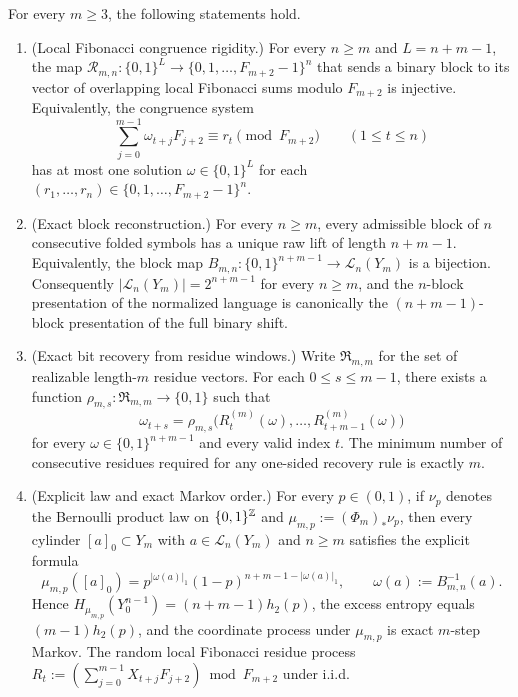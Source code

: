 \begin{theorem}
\label{thm:intro-main}
For every $m\ge 3$, the following statements hold.
\begin{enumerate}[label=\textup{(\roman*)}]
\item\label{item:main-congruence-rigidity}
\textup{(Local Fibonacci congruence rigidity.)}
For every $n\ge m$ and $L=n+m-1$, the map
$\mathcal R_{m,n}:\{0,1\}^L\to\{0,1,\ldots,F_{m+2}-1\}^n$ that sends a binary
block to its vector of overlapping local Fibonacci sums modulo $F_{m+2}$ is
injective.  Equivalently, the congruence system
\[
\sum_{j=0}^{m-1}\omega_{t+j}F_{j+2}\equiv r_t\pmod{F_{m+2}}
\qquad (1\le t\le n)
\]
has at most one solution $\omega\in\{0,1\}^L$ for each
$(r_1,\ldots,r_n)\in\{0,1,\ldots,F_{m+2}-1\}^n$.
\item\label{item:main-block-bijection}
\textup{(Exact block reconstruction.)}
For every $n\ge m$, every admissible block of $n$ consecutive folded
symbols has a unique raw lift of length $n+m-1$.  Equivalently, the block map
$B_{m,n}:\{0,1\}^{n+m-1}\to\mathcal L_n(Y_m)$ is a bijection.
Consequently
$\lvert\mathcal L_n(Y_m)\rvert=2^{n+m-1}$ for every $n\ge m$, and the
$n$-block presentation of the normalized language is canonically the
$(n+m-1)$-block presentation of the full binary shift.
\item\label{item:main-bit-recovery}
\textup{(Exact bit recovery from residue windows.)}
Write $\mathfrak{R}_{m,m}$ for the set of realizable length-$m$ residue
vectors.  For each $0\le s\le m-1$, there exists a function
$\rho_{m,s}:\mathfrak{R}_{m,m}\to\{0,1\}$ such that
\[
\omega_{t+s}=\rho_{m,s}\bigl(R_t^{(m)}(\omega),\ldots,R_{t+m-1}^{(m)}(\omega)\bigr)
\]
for every $\omega\in\{0,1\}^{n+m-1}$ and every valid index $t$.  The minimum
number of consecutive residues required for any one-sided recovery rule is
exactly $m$.
\item\label{item:main-bernoulli}
\textup{(Explicit law and exact Markov order.)}
For every $p\in(0,1)$, if $\nu_p$ denotes the Bernoulli product law on
$\{0,1\}^{\mathbb{Z}}$ and $\mu_{m,p}:=(\Phi_m)_*\nu_p$, then every cylinder
$[a]_0\subset Y_m$ with $a\in\mathcal L_n(Y_m)$ and $n\ge m$ satisfies the
explicit formula
\[
\mu_{m,p}([a]_0)=p^{|\omega(a)|_1}(1-p)^{n+m-1-|\omega(a)|_1},
\qquad
\omega(a):=B_{m,n}^{-1}(a).
\]
Hence
$H_{\mu_{m,p}}(Y_0^{n-1})=(n+m-1)h_2(p)$, the excess entropy equals
$(m-1)h_2(p)$, and the coordinate process under $\mu_{m,p}$ is exact
$m$-step Markov.  The random local Fibonacci residue process
$R_t:=(\sum_{j=0}^{m-1}X_{t+j}F_{j+2})\bmod F_{m+2}$ under i.i.d.\

\end{enumerate}
\end{theorem}
